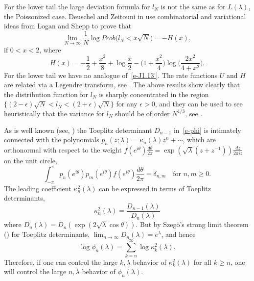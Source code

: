 \documentclass{amsart}
\theoremstyle{definition}
\theoremstyle{remark}
\numberwithin{equation}{section}
\begin{document}
For the lower tail the large deviation formula for $l_N$ is not the
same as for $L(\lambda)$, the Poissonized case. Deuschel and Zeitouni
in \cite{DeZe2} use combinatorial and variational
ideas from Logan and Shepp \cite{LS} to prove that
\begin{equation}\label{e-z50}
  \lim_{N\to\infty} \frac1{N} \log Prob\bigl( l_N<x\sqrt{N}\bigr)
=-H(x),
\end{equation}
if $0<x<2$, where
\begin{equation}\label{e-J15}
  H(x)=-\frac12 +\frac{x^2}8+\log\frac{x}2
-\bigl(1+\frac{x^2}4\bigr)\log\bigl(\frac{2x^2}{4+x^2}\bigr).
\end{equation}
For the lower tail we have no analogue of~\eqref{e-J1.13'}. The rate functions
$U$ and $H$ are related via a Legendre transform, see \cite{Se2}.
The above results show clearly that the distribution function for
$l_N$ is sharply concentrated in the region
$\{ (2-\epsilon)\sqrt{N} < l_N < (2+\epsilon)\sqrt{N} \}$ for
any $\epsilon >0$, and they can be used to see heuristically that the
variance for $l_N$ should be of order $N^{1/3}$, see \cite{Ki}.

\bigskip
As is well known (see, \cite{Sz}) the Toeplitz determinant $D_{n-1}$ 
in~\eqref{e-phi} 
is intimately connected with the polynomials  
$p_n(z;\lambda)=\kappa_n(\lambda)z^n+\cdots$, 
which are orthonormal with respect to 
the weight $f(e^{i\theta})\frac{d\theta}{2\pi}=
\exp(\sqrt{\lambda}(z+z^{-1})) \frac{dz}{2\pi iz}$
on the unit circle, 
\begin{equation}
   \int_{-\pi}^{\pi} p_n(e^{i\theta})\overline{p_m(e^{i\theta})} 
f(e^{i\theta})\frac{d\theta}{2\pi}
=\delta_{n,m} \quad\text{for $n,m\geq 0$}.
\end{equation}
The leading coefficient $\kappa^2_n(\lambda)$ can be expressed
in terms of Toeplitz determinants,
\begin{equation}
   \kappa_n^2(\lambda)=\frac{D_{n-1}(\lambda)}{D_n(\lambda)}
\end{equation}
where $D_n(\lambda)=D_n(\exp(2\sqrt{\lambda}\cos\theta))$.
But by Szeg\"o's strong limit theorem (\cite{Sz2})
for Toeplitz determinants, 
$\lim_{n\to\infty}D_{n}(\lambda)=e^{\lambda}$, and hence 
\begin{equation}
  \log\phi_n(\lambda) =  \sum_{k=n}^{\infty} \log{\kappa^2_{k}(\lambda)}.
\end{equation}
Therefore, if one can control the large $k,\lambda$
behavior of $\kappa^2_{k}(\lambda)$
for all $k\geq n$, one will control the large 
$n,\lambda$ behavior of $\phi_n(\lambda)$.
\end{document}
